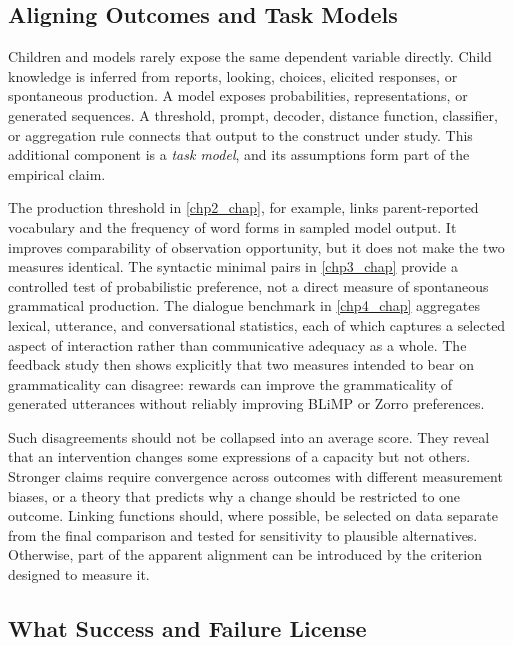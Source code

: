 \subsection{Aligning Outcomes and Task Models}
\label{sec:gd_calibration_outcome}

Children and models rarely expose the same dependent variable directly. Child knowledge is inferred from reports, looking, choices, elicited responses, or spontaneous production. A model exposes probabilities, representations, or generated sequences. A threshold, prompt, decoder, distance function, classifier, or aggregation rule connects that output to the construct under study. This additional component is a \emph{task model}, and its assumptions form part of the empirical claim.

The \meCDI{} production threshold in \cref{chp2_chap}, for example, links parent-reported vocabulary and the frequency of word forms in sampled model output. It improves comparability of observation opportunity, but it does not make the two measures identical. The syntactic minimal pairs in \cref{chp3_chap} provide a controlled test of probabilistic preference, not a direct measure of spontaneous grammatical production. The dialogue benchmark in \cref{chp4_chap} aggregates lexical, utterance, and conversational statistics, each of which captures a selected aspect of interaction rather than communicative adequacy as a whole. The feedback study then shows explicitly that two measures intended to bear on grammaticality can disagree: rewards can improve the grammaticality of generated utterances without reliably improving BLiMP or Zorro preferences.

Such disagreements should not be collapsed into an average score. They reveal that an intervention changes some expressions of a capacity but not others. Stronger claims require convergence across outcomes with different measurement biases, or a theory that predicts why a change should be restricted to one outcome. Linking functions should, where possible, be selected on data separate from the final comparison and tested for sensitivity to plausible alternatives. Otherwise, part of the apparent alignment can be introduced by the criterion designed to measure it.

\subsection{What Success and Failure License}
\label{sec:gd_calibration_claims}

